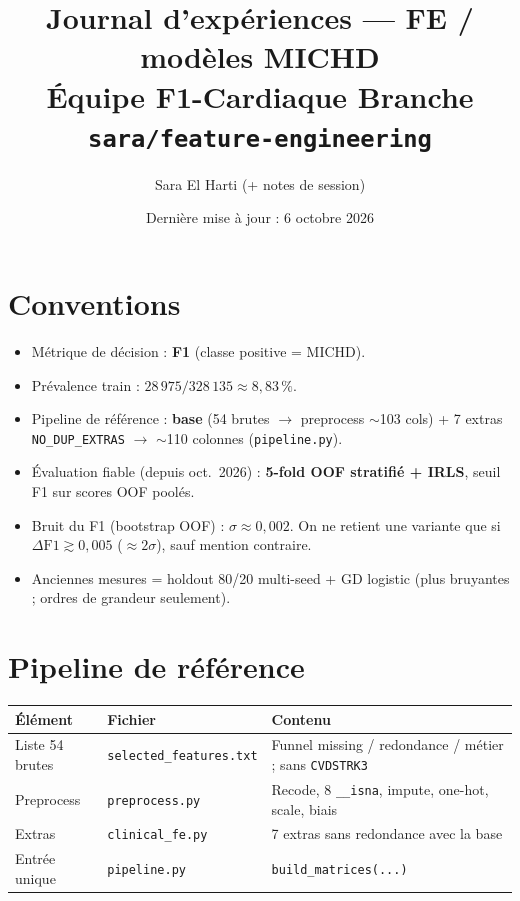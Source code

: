 \documentclass[11pt,a4paper]{article}
\title{Journal d'expériences --- FE / modèles MICHD\\
\large Équipe F1-Cardiaque \textperiodcentered{} Branche \texttt{sara/feature-engineering}}
\author{Sara El Harti (+ notes de session)}
\date{Dernière mise à jour : 6 octobre 2026}
\begin{document}
\maketitle

\section{Conventions}
\begin{itemize}
  \item Métrique de décision : \textbf{F1} (classe positive = MICHD).
  \item Prévalence train : $28\,975 / 328\,135 \approx 8{,}83\,\%$.
  \item Pipeline de référence : \textbf{base} (54 brutes $\to$ preprocess $\sim$103 cols)
        + 7 extras \texttt{NO\_DUP\_EXTRAS} $\to$ $\sim$110 colonnes
        (\texttt{pipeline.py}).
  \item Évaluation fiable (depuis oct.\ 2026) : \textbf{5-fold OOF stratifié + IRLS},
        seuil F1 sur scores OOF poolés.
  \item Bruit du F1 (bootstrap OOF) : $\sigma \approx 0{,}002$.
        On ne retient une variante que si $\Delta\mathrm{F1} \gtrsim 0{,}005$
        ($\approx 2\sigma$), sauf mention contraire.
  \item Anciennes mesures = holdout 80/20 multi-seed + GD logistic (plus bruyantes ;
        ordres de grandeur seulement).
\end{itemize}

\section{Pipeline de référence}
\begin{tabular}{@{}llp{7.2cm}@{}}
\toprule
Élément & Fichier & Contenu \\
\midrule
Liste 54 brutes & \texttt{selected\_features.txt} & Funnel missing / redondance / métier ; sans \texttt{CVDSTRK3} \\
Preprocess & \texttt{preprocess.py} & Recode, 8 \texttt{\_\_isna}, impute, one-hot, scale, biais \\
Extras & \texttt{clinical\_fe.py} & 7 extras sans redondance avec la base \\
Entrée unique & \texttt{pipeline.py} & \texttt{build\_matrices(...)} \\
\bottomrule
\end{tabular}
\end{document}
